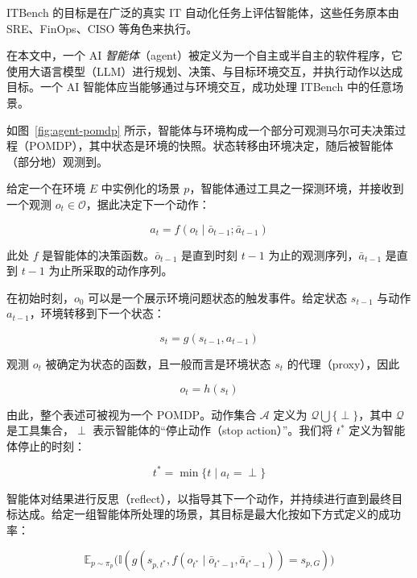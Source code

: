 \documentclass[10pt,UTF8,fontset=fandol]{ctexart}
\begin{document}
ITBench 的目标是在广泛的真实 IT 自动化任务上评估智能体，这些任务原本由 SRE、FinOps、CISO 等角色来执行。

在本文中，一个 AI \emph{智能体}（agent）被定义为一个自主或半自主的软件程序，它使用大语言模型（LLM）进行规划、决策、与目标环境交互，并执行动作以达成目标。一个 AI 智能体应当能够通过与环境交互，成功处理 ITBench 中的任意场景。

如图~\ref{fig:agent-pomdp} 所示，智能体与环境构成一个部分可观测马尔可夫决策过程（POMDP），其中状态是环境的快照。状态转移由环境决定，随后被智能体（部分地）观测到。

给定一个在环境 $E$ 中实例化的场景 $p$，智能体通过工具之一探测环境，并接收到一个观测 $o_t \in \mathcal{O}$，据此决定下一个动作：

\begin{equation}
a_t = f(o_t \mid \bar o_{t-1}; \bar a_{t-1}) \tag{1}
\end{equation}

此处 $f$ 是智能体的决策函数。$\bar o_{t-1}$ 是直到时刻 $t-1$ 为止的观测序列，$\bar a_{t-1}$ 是直到 $t-1$ 为止所采取的动作序列。

在初始时刻，$o_0$ 可以是一个展示环境问题状态的触发事件。给定状态 $s_{t-1}$ 与动作 $a_{t-1}$，环境转移到下一个状态：

\begin{equation}
s_t = g(s_{t-1}, a_{t-1}) \tag{2}
\end{equation}

观测 $o_t$ 被确定为状态的函数，且一般而言是环境状态 $s_t$ 的代理（proxy），因此

\begin{equation}
o_t = h(s_t) \tag{3}
\end{equation}

由此，整个表述可被视为一个 POMDP。动作集合 $\mathcal{A}$ 定义为 $\mathcal{Q} \bigcup \{\perp\}$，其中 $\mathcal{Q}$ 是工具集合，$\perp$ 表示智能体的“停止动作（stop action）”。我们将 $t^*$ 定义为智能体停止的时刻：

\begin{equation}
t^* = \min\{t \mid a_t = \perp\} \tag{4}
\end{equation}

智能体对结果进行反思（reflect），以指导其下一个动作，并持续进行直到最终目标达成。给定一组智能体所处理的场景，其目标是最大化按如下方式定义的成功率：

\begin{equation}
\mathbb{E}_{p\sim\pi_p}\big( \mathbb{I}( g(s_{p,t^*}, f(o_{t^*}\mid \bar o_{t^*-1}, \bar a_{t^*-1})) = s_{p,G}) \big) \tag{5}
\end{equation}
\end{document}
